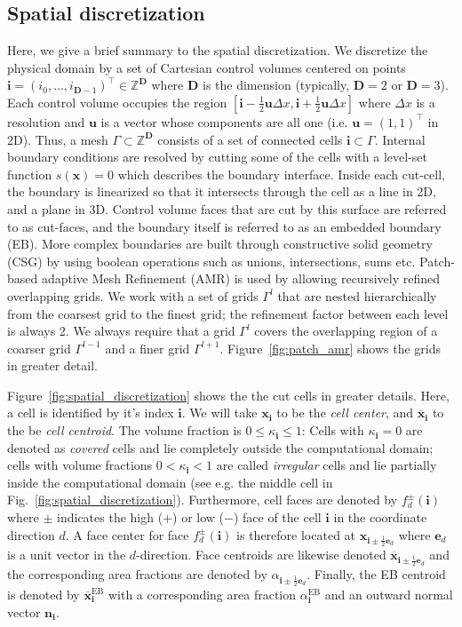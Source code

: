 \documentclass[3p]{elsarticle}
\def\bmi{\ensuremath{\bm{i}}}
\begin{document}
\subsection{Spatial discretization}
Here, we give a brief summary to the spatial discretization. We discretize the physical domain by a set of Cartesian control volumes centered on points $\bmi = (i_0, \ldots, i_{\bm{D}-1})^\intercal \in \mathbb{Z}^{\bm{D}}$ where $\bm{D}$ is the dimension (typically, $\bm{D} = 2$ or $\bm{D} = 3$). Each control volume occupies the region $[\bmi - \frac{1}{2}\bm{u}\Delta x, \bmi + \frac{1}{2}\bm{u}\Delta x]$ where $\Delta x$ is a resolution and $\bm{u}$ is a vector whose components are all one (i.e. $\bm{u} = (1,1)^\intercal$ in 2D). Thus, a mesh $\Gamma\subset \mathbb{Z}^{\bm{D}}$ consists of a set of connected cells $\bmi \subset \Gamma$. Internal boundary conditions are resolved by cutting some of the cells with a level-set function $s(\bm{x}) = 0$ which describes the boundary interface. Inside each cut-cell, the boundary is linearized so that it intersects through the cell as a line in 2D, and a plane in 3D. Control volume faces that are cut by this surface are referred to as cut-faces, and the boundary itself is referred to as an embedded boundary (EB). More complex boundaries are built through constructive solid geometry (CSG) by using boolean operations such as unions, intersections, sums etc. Patch-based adaptive Mesh Refinement (AMR) is used by allowing recursively refined overlapping grids. We work with a set of grids $\Gamma^l$ that are nested hierarchically from the coarsest grid to the finest grid; the refinement factor between each level is always 2. We always require that a grid $\Gamma^l$ covers the overlapping region of a coarser grid $\Gamma^{l-1}$ and a finer grid $\Gamma^{l+1}$. Figure~\ref{fig:patch_amr} shows the grids in greater detail. 

Figure~\ref{fig:spatial_discretization} shows the the cut cells in greater details. Here, a cell is identified by it's index $\bmi$. We will take $\bm{x}_{\bmi}$ to be the \emph{cell center}, and $\overline{\bm{x}}_{\bmi}$ to the be \emph{cell centroid}. The volume fraction is $0 \leq \kappa_{\bmi} \leq 1$: Cells with $\kappa_{\bmi} = 0$ are denoted as \emph{covered} cells and lie completely outside the computational domain; cells with volume fractions $0 < \kappa_{\bmi} < 1$ are called \emph{irregular} cells and lie partially inside the computational domain (see e.g. the middle cell in Fig.~\ref{fig:spatial_discretization}). Furthermore, cell faces are denoted by $f^\pm_d(\bmi)$ where $\pm$ indicates the high ($+$) or low ($-$) face of the cell $\bmi$ in the coordinate direction $d$. A face center for face $f^\pm_d(\bmi)$ is therefore located at $\bm{x}_{\bmi \pm \frac{1}{2}\mathbf{e}_d}$ where $\mathbf{e}_d$ is a unit vector in the $d$-direction. Face centroids are likewise denoted $\overline{\bm{x}}_{\bmi \pm \frac{1}{2}\mathbf{e}_d}$ and the corresponding area fractions are denoted by $\alpha_{\bmi\pm\frac{1}{2}\bm{e}_d}$. Finally, the EB centroid is denoted by $\overline{\bm{x}}_{\bmi}^{\text{EB}}$ with a corresponding area fraction $\alpha^{\text{EB}}_{\bmi}$ and an outward normal vector $\bm{n}_{\bmi}$.
\end{document}
